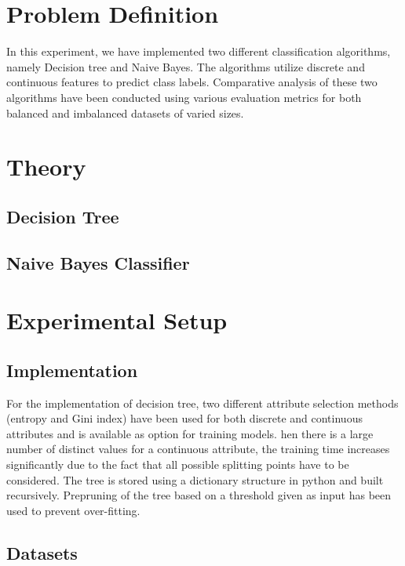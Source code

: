 \documentclass[12pt]{article}
\begin{document}
\maketitle
\thispagestyle{empty}
\clearpage
\newpage

\section{Problem Definition}
In this experiment, we have implemented two different classification algorithms, namely Decision tree and Naive Bayes. The algorithms utilize discrete and continuous features to predict class labels. Comparative analysis of these two algorithms have been conducted using various evaluation metrics for both balanced and imbalanced datasets of varied sizes.



\section{Theory}
\subsection{Decision Tree}

\subsection{Naive Bayes Classifier}


\section{Experimental Setup}
\subsection{Implementation}
For the implementation of decision tree, two different attribute selection methods (entropy and Gini index) have been used for both discrete and continuous attributes and is available as option for training models. hen there is a large number of distinct values for a continuous attribute, the training time increases significantly due to the fact that all possible splitting points have to be considered. The tree is stored using a dictionary structure in python and built recursively. Prepruning of the tree based on a threshold given as input has been used to prevent over-fitting.

\subsection{Datasets}
\end{document}
